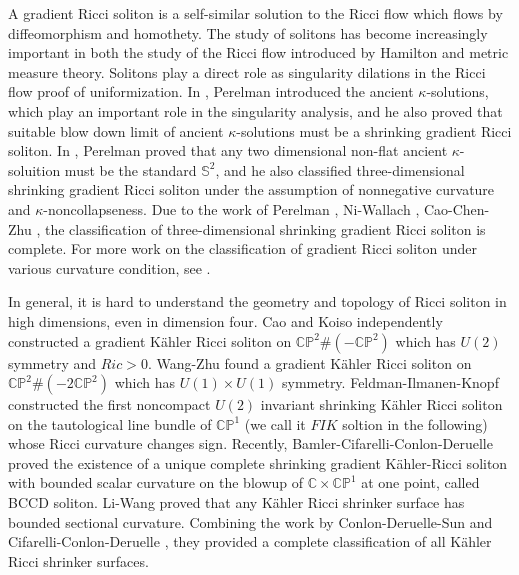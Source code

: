 \documentclass[12pt]{amsart}
\begin{document}
	A gradient Ricci soliton is a self-similar solution to the Ricci flow which flows by diffeomorphism and homothety. The study of solitons has become increasingly important in both the study of the Ricci flow introduced by Hamilton \cite{Hamilton} and metric measure theory. Solitons play a direct role as singularity dilations in the Ricci flow proof of uniformization. In \cite{Perelman1}, Perelman introduced the ancient $\kappa$-solutions, which
	play an important role in the singularity analysis, and he also proved that suitable blow down limit of ancient $\kappa$-solutions must be a shrinking gradient Ricci soliton. In \cite{Perelman2}, Perelman proved that any two dimensional non-flat ancient $\kappa$-soluition must be the standard $\mathbb S^2$, and he also classified three-dimensional shrinking gradient Ricci soliton under the assumption of nonnegative curvature and $\kappa$-noncollapseness. Due to the work of Perelman \cite{Perelman2}, Ni-Wallach \cite{Ni-Wallach}, Cao-Chen-Zhu \cite{Cao-Chen-Zhu}, the classification of three-dimensional shrinking gradient Ricci soliton is complete. For more work on the classification of gradient Ricci soliton under various curvature condition, see \cite{Brendle1, Brendle2, Cao-Chen, Cao-Xie, Cao-Chen-Zhu, Cao-Chen2, Cao-Wang-Zhang, Chen-Wang,Kotschwar, Eminenti-LaNave-Mantegazza,Munteanu-Wang4,  Naber, Petersen-Wylie, Pigola-Rimoldi-Setti, Wu-Wu-Wylie, Wu-Zhang, Zhang}.
	
	
	\smallskip
	In general, it is hard to understand the geometry and topology of Ricci soliton in high dimensions, even in dimension four. Cao \cite{Cao} and Koiso \cite{Koiso} independently constructed a gradient K\"ahler Ricci soliton on $\mathbb{CP}^2\# (- \mathbb{CP}^2)$ which has $U(2)$ symmetry and $Ric>0$.
	Wang-Zhu \cite{Wang-Zhu} found a gradient K\"ahler Ricci soliton on $\mathbb{CP}^2 \# (-2 \mathbb{CP}^2)$ which has $U(1)\times U(1)$ symmetry.
	Feldman-Ilmanen-Knopf \cite{Feldman-Ilmanen-Knopf} constructed the first noncompact $U(2)$ invariant shrinking K\"ahler Ricci soliton on the tautological line bundle of $\mathbb{CP}^1$ (we call it $FIK$ soltion in the following) whose Ricci curvature changes sign.
	Recently, Bamler-Cifarelli-Conlon-Deruelle \cite{BCCD22} proved the existence of a unique complete shrinking gradient K\"ahler-Ricci soliton with bounded scalar curvature on the blowup of $\mathbb{C}\times \mathbb{CP}^{1}$ at one point, called BCCD soliton.
	Li-Wang  \cite{Li-Wang}  proved that any K\"ahler Ricci shrinker surface has bounded sectional curvature. Combining the work by Conlon-Deruelle-Sun \cite{Conlon-Deruelle-Sun} and Cifarelli-Conlon-Deruelle \cite{CCD22}, they provided a complete classification of all K\"ahler Ricci shrinker surfaces.
	
\end{document}
